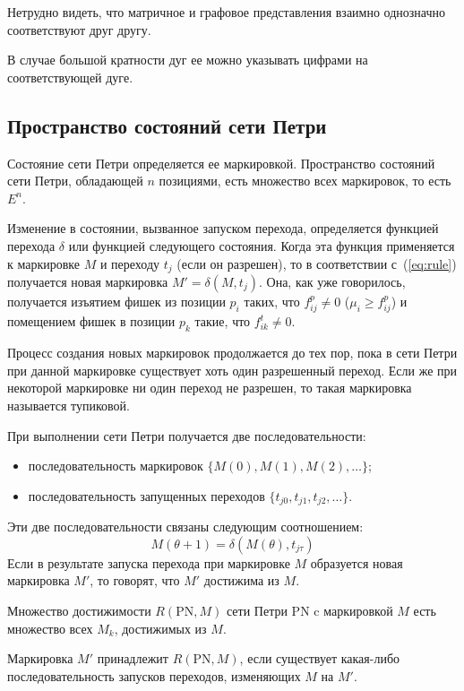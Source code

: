 Нетрудно видеть, что матричное и графовое представления взаимно однозначно соответствуют друг другу.

В случае большой кратности дуг ее можно указывать цифрами на соответствующей дуге.

\subsection{Пространство состояний сети Петри}

Состояние сети Петри определяется ее маркировкой. Пространство состояний сети Петри, обладающей $n$ позициями, есть множество всех маркировок, то есть $E^n$.

Изменение в состоянии, вызванное запуском перехода, определяется функцией перехода $\delta$ или функцией следующего состояния. Когда эта функция применяется к маркировке $M$ и переходу $t_j$ (если он разрешен), то в соответствии с~(\ref{eq:rule}) получается новая маркировка ${M' = \delta(M, t_j)}$. Она, как уже говорилось, получается изъятием фишек из позиции $p_i$ таких, что ${f_{ij}^p\neq 0}$ (${\mu_i\geqslant f_{ij}^p}$) и помещением фишек в позиции $p_k$ такие, что ${f_{ik}^t\neq 0}$.

Процесс создания новых маркировок продолжается до тех пор, пока в сети Петри при данной маркировке существует хоть один разрешенный переход. Если же при некоторой маркировке ни один переход не разрешен, то такая маркировка называется тупиковой.

При выполнении сети Петри получается две последовательности:

\begin{itemize}
    \item последовательность маркировок ${\{ M(0), M(1), M(2), \dots \}}$;
    \item последовательность запущенных переходов ${\{ t_{j0}, t_{j1}, t_{j2}, \dots \}}$.
\end{itemize}

Эти две последовательности связаны следующим соотношением:
%
\begin{equation*}
    M(\theta + 1) = \delta(M(\theta), t_{j\tau})
\end{equation*}
%
Если в результате запуска перехода при маркировке $M$ образуется новая маркировка $M'$, то говорят, что $M'$ достижима из $M$.

Множество достижимости ${R(\text{PN}, M)}$ сети Петри PN c маркировкой $M$ есть множество всех $M_k$, достижимых из $M$.

Маркировка $M'$ принадлежит $R(\text{PN}, M)$, если существует какая-либо последовательность запусков переходов, изменяющих $M$ на $M'$.

